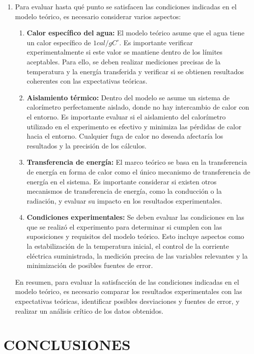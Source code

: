 \documentclass[10pt]{article}
\begin{document}
\begin{multicols*}{2}
\begin{enumerate}
    \item Para evaluar hasta qué punto se satisfacen las condiciones indicadas en el modelo teórico, es necesario considerar varios aspectos:
    \begin{enumerate}
        \item \textbf{Calor específico del agua:} El modelo teórico asume que el agua tiene un calor específico de  $1 cal/g C ^\circ$. Es importante verificar experimentalmente si este valor se mantiene dentro de los límites aceptables. Para ello, se deben realizar mediciones precisas de la temperatura y la energía transferida y verificar si se obtienen resultados coherentes con las expectativas teóricas.
        \item  \textbf{Aislamiento térmico:} Dentro del modelo se asume un sistema de calorímetro perfectamente aislado, donde no hay intercambio de calor con el entorno. Es importante evaluar si el aislamiento del calorímetro utilizado en el experimento es efectivo y minimiza las pérdidas de calor hacia el entorno. Cualquier fuga de calor no deseada afectaría los resultados y la precisión de los cálculos.
        \item  \textbf{Transferencia de energía:} El marco teórico se basa en la transferencia de energía en forma de calor como el único mecanismo de transferencia de energía en el sistema. Es importante considerar si existen otros mecanismos de transferencia de energía, como la conducción o la radiación, y evaluar su impacto en los resultados experimentales.
        \item  \textbf{Condiciones experimentales:} Se deben evaluar las condiciones en las que se realizó el experimento para determinar si cumplen con las suposiciones y requisitos del modelo teórico. Esto incluye aspectos como la estabilización de la temperatura inicial, el control de la corriente eléctrica suministrada, la medición precisa de las variables relevantes y la 
        minimización de posibles fuentes de error.
    \end{enumerate}

    En resumen, para evaluar la satisfacción de las condiciones indicadas en el modelo teórico, es necesario comparar los resultados experimentales con las expectativas teóricas, identificar posibles desviaciones y fuentes de error, y realizar un análisis crítico de los datos obtenidos.
\end{enumerate}




\section{\small CONCLUSIONES}


\end{multicols*}
\end{document}
